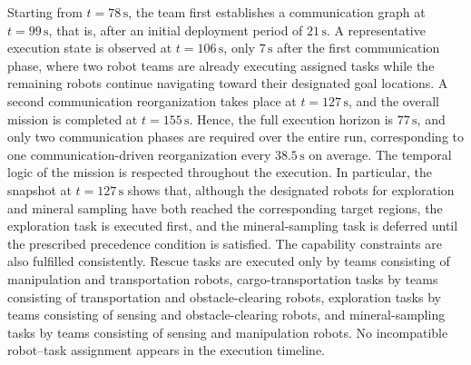Starting from $t=78\,\mathrm{s}$, the team first establishes a
communication graph at $t=99\,\mathrm{s}$, that is, after an
initial deployment period of $21\,\mathrm{s}$. A representative
execution state is observed at $t=106\,\mathrm{s}$, only
$7\,\mathrm{s}$ after the first communication phase, where two
robot teams are already executing assigned tasks while the
remaining robots continue navigating toward their designated
goal locations. A second communication reorganization takes
place at $t=127\,\mathrm{s}$, and the overall mission is
completed at $t=155\,\mathrm{s}$. Hence, the full execution
horizon is $77\,\mathrm{s}$, and only two communication phases
are required over the entire run, corresponding to one
communication-driven reorganization every
$38.5\,\mathrm{s}$ on average.
The temporal logic of the mission is respected throughout the
execution. In particular, the snapshot at $t=127\,\mathrm{s}$
shows that, although the designated robots for exploration and
mineral sampling have both reached the corresponding target
regions, the exploration task is executed first, and the
mineral-sampling task is deferred until the prescribed
precedence condition is satisfied. The capability constraints
are also fulfilled consistently. Rescue tasks are executed only
by teams consisting of manipulation and transportation robots,
cargo-transportation tasks by teams consisting of
transportation and obstacle-clearing robots, exploration tasks
by teams consisting of sensing and obstacle-clearing robots,
and mineral-sampling tasks by teams consisting of sensing and
manipulation robots. No incompatible robot--task assignment
appears in the execution timeline.

